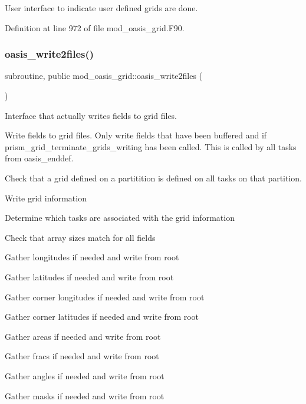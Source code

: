 User interface to indicate user defined grids are done. 



Definition at line 972 of file mod\+\_\+oasis\+\_\+grid.\+F90.

\mbox{\label{namespacemod__oasis__grid_a275791c512cefae9799e188d92b6f9d4}} 
\subsubsection{\texorpdfstring{oasis\+\_\+write2files()}{oasis\_write2files()}}
{\footnotesize\ttfamily subroutine, public mod\+\_\+oasis\+\_\+grid\+::oasis\+\_\+write2files (\begin{DoxyParamCaption}{ }\end{DoxyParamCaption})}



Interface that actually writes fields to grid files. 

Write fields to grid files. Only write fields that have been buffered and if prism\+\_\+grid\+\_\+terminate\+\_\+grids\+\_\+writing has been called. This is called by all tasks from oasis\+\_\+enddef.


\begin{DoxyItemize}
\item Check that a grid defined on a partitition is defined on all tasks on that partition.
\item Write grid information
\begin{DoxyItemize}
\item Determine which tasks are associated with the grid information
\item Check that array sizes match for all fields
\item Gather longitudes if needed and write from root
\item Gather latitudes if needed and write from root
\item Gather corner longitudes if needed and write from root
\item Gather corner latitudes if needed and write from root
\item Gather areas if needed and write from root
\item Gather fracs if needed and write from root
\item Gather angles if needed and write from root
\item Gather masks if needed and write from root 
\end{DoxyItemize}
\end{DoxyItemize}

